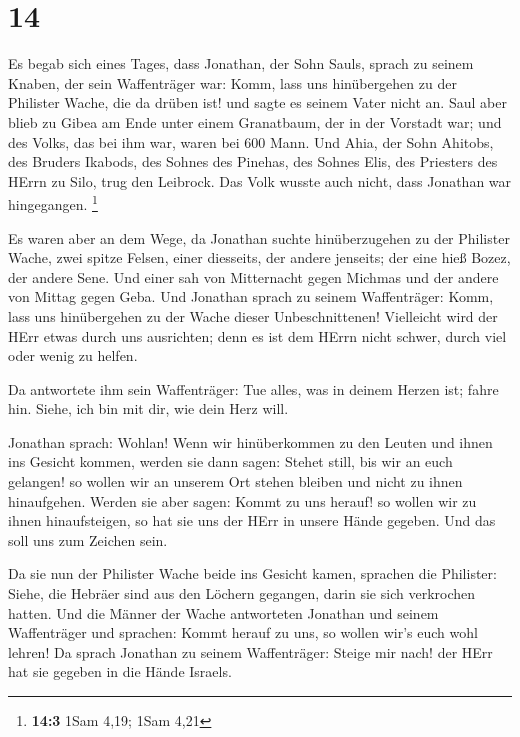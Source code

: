 \hypertarget{section-13}{%
\section{14}\label{section-13}}

 Es begab sich eines Tages, dass Jonathan, der Sohn Sauls,
sprach zu seinem Knaben, der sein Waffenträger war: Komm, lass uns
hinübergehen zu der Philister Wache, die da drüben ist! und sagte es
seinem Vater nicht an.  Saul aber blieb zu Gibea am Ende
unter einem Granatbaum, der in der Vorstadt war; und des Volks, das bei
ihm war, waren bei 600 Mann.  Und Ahia, der Sohn Ahitobs,
des Bruders Ikabods, des Sohnes des Pinehas, des Sohnes Elis, des
Priesters des HErrn zu Silo, trug den Leibrock. Das Volk wusste auch
nicht, dass Jonathan war hingegangen. \footnote{\textbf{14:3} 1Sam 4,19;
  1Sam 4,21}

 Es waren aber an dem Wege, da Jonathan suchte
hinüberzugehen zu der Philister Wache, zwei spitze Felsen, einer
diesseits, der andere jenseits; der eine hieß Bozez, der andere Sene.
 Und einer sah von Mitternacht gegen Michmas und der
andere von Mittag gegen Geba.  Und Jonathan sprach zu
seinem Waffenträger: Komm, lass uns hinübergehen zu der Wache dieser
Unbeschnittenen! Vielleicht wird der HErr etwas durch uns ausrichten;
denn es ist dem HErrn nicht schwer, durch viel oder wenig zu helfen.

 Da antwortete ihm sein Waffenträger: Tue alles, was in
deinem Herzen ist; fahre hin. Siehe, ich bin mit dir, wie dein Herz
will.

 Jonathan sprach: Wohlan! Wenn wir hinüberkommen zu den
Leuten und ihnen ins Gesicht kommen,  werden sie dann
sagen: Stehet still, bis wir an euch gelangen! so wollen wir an unserem
Ort stehen bleiben und nicht zu ihnen hinaufgehen. 
Werden sie aber sagen: Kommt zu uns herauf! so wollen wir zu ihnen
hinaufsteigen, so hat sie uns der HErr in unsere Hände gegeben. Und das
soll uns zum Zeichen sein.

 Da sie nun der Philister Wache beide ins Gesicht kamen,
sprachen die Philister: Siehe, die Hebräer sind aus den Löchern
gegangen, darin sie sich verkrochen hatten.  Und die
Männer der Wache antworteten Jonathan und seinem Waffenträger und
sprachen: Kommt herauf zu uns, so wollen wir's euch wohl lehren! Da
sprach Jonathan zu seinem Waffenträger: Steige mir nach! der HErr hat
sie gegeben in die Hände Israels.

